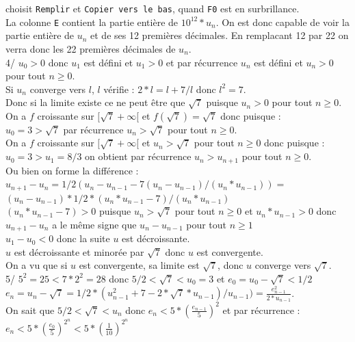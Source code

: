 \documentclass[a4paper,11pt]{book}
\begin{document}
choisit {\tt Remplir} et {\tt Copier vers le bas}, quand 
{\tt F0}  est en surbrillance.\\
La colonne {\tt E} contient la partie enti\`ere de $10^{12} *u_n$. On est donc 
capable de voir la partie enti\`ere de $u_n$ et de ses 12 premi\`eres 
d\'ecimales. En remplacant 12 par 22 on verra donc les 22 premi\`eres 
d\'ecimales de $u_n$.\\
4/ $u_0>0$ donc $u_1$ est d\'efini et $u_1>0$ et par r\'ecurrence 
$u_n$ est d\'efini et $u_n>0$ pour tout $n \geq 0$.\\
Si $u_n$ converge  vers $l$, $l$ v\'erifie :
$2*l=l+7/l$ donc $l^2=7$.\\
Donc si la limite existe ce ne peut \^etre que $\sqrt7$ puisque $u_n>0$ 
pour tout $n \geq 0$.\\
On a $f$ croissante sur $[\sqrt 7 +\infty[$ et $f(\sqrt 7)=\sqrt 7$
donc puisque :\\
$u_0=3>\sqrt 7$ par r\'ecurrence $u_n>\sqrt 7$ pour tout $n \geq 0$.\\
On a $f$ croissante sur $[\sqrt 7 +\infty[$ et $u_n>\sqrt 7$ pour tout 
$n \geq 0$
donc puisque :\\
$u_0=3>u_1=8/3$ on obtient par r\'ecurrence $u_n>u_{n+1}$ pour tout $n \geq 0$.\\
Ou bien on forme la diff\'erence :\\
$u_{n+1}-u_n=1/2(u_n-u_{n-1}-7(u_n-u_{n-1})/(u_n*u_{n-1}))=$\\
$(u_n-u_{n-1})*1/2*(u_n*u_{n-1}-7)/(u_n*u_{n-1})$\\
$(u_n*u_{n-1}-7)> 0$ puisque $u_n>\sqrt 7$ pour tout $n \geq 0$ et $u_n*u_{n-1}>0$ donc\\
 $u_{n+1}-u_n$ a le m\^eme signe que $u_n-u_{n-1}$ pour tout $n \geq 1$\\
$u_1-u_0<0$ donc la suite $u$ est d\'ecroissante.\\
$u$ est d\'ecroissante et minor\'ee par $\sqrt 7$ donc $u$ est convergente.\\
On a vu que si $u$ est convergente, sa limite est $\sqrt 7$, donc $u$ converge vers $\sqrt 7$.\\
5/ $5^2=25 < 7*2^2=28$ donc $5/2<\sqrt 7<u_0=3$ et $e_0=u_0-\sqrt 7<1/2$\\
$e_n=u_n-\sqrt 7=1/2*(u_{n-1}^2+7-2*\sqrt 7*u_{n-1})/u_{n-1})=\frac{e_{n-1}^2}{2*u_{n-1}}$.\\
On sait que $5/2<\sqrt 7<u_n$ donc $e_n<5*(\frac {e_{n-1}}{5})^2$ et par
r\'ecurrence  :\\
$e_n<5*(\frac{e_0}{5})^{2^{n}}<5*(\frac{1}{10})^{2^{n}}$
\end{document}
